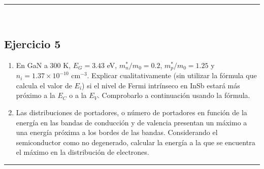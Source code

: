 \rule{\textwidth}{0.1pt} \\[2pt]

\subsection{Ejercicio 5}

\begin{enumerate}[label=\alph*)]
	\item En GaN a 300 K, $E_G = 3.43$ eV, $m_n^*/m_0 = 0.2$, $m_p^*/m_0 = 1.25$ y $n_i = 1.37 \times 10^{-10} \text{ cm}^{-3}$. Explicar cualitativamente (sin utilizar la fórmula que calcula el valor de $E_i$) si el nivel de Fermi intrínseco en InSb estará más próximo a la $E_C$ o a la $E_V$. Comprobarlo a continuación usando la fórmula.

	\item Las distribuciones de portadores, o número de portadores en función de la energía en las bandas de conducción y de valencia presentan un máximo a una energía próxima a los bordes de las bandas. Considerando el semiconductor como no degenerado, calcular la energía a la que se encuentra el máximo en la distribución de electrones.
\end{enumerate}

\rule{\textwidth}{0.1pt} \\[2pt]


